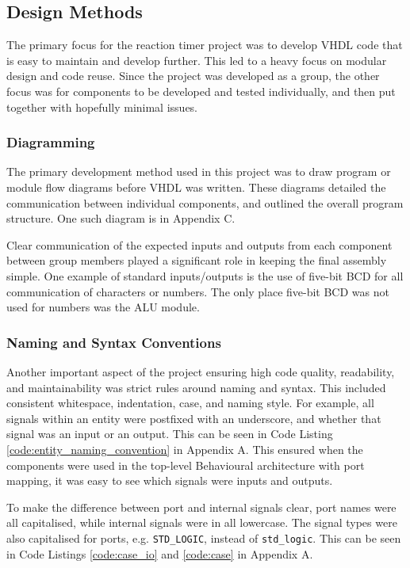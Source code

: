 \documentclass[11pt]{article}
\begin{document}
\subsection{Design Methods}

The primary focus for the reaction timer project was to develop VHDL code that is easy to maintain and develop further. This led to a heavy focus on modular design and code reuse. Since the project was developed as a group, the other focus was for components to be developed and tested individually, and then put together with hopefully minimal issues.

\subsubsection{Diagramming}

The primary development method used in this project was to draw program or module flow diagrams before VHDL was written. These diagrams detailed the communication between individual components, and outlined the overall program structure. One such diagram is in Appendix C.

Clear communication of the expected inputs and outputs from each component between group members played a significant role in keeping the final assembly simple. One example of standard inputs/outputs is the use of five-bit BCD for all communication of characters or numbers. The only place five-bit BCD was not used for numbers was the ALU module.

\subsubsection{Naming and Syntax Conventions}

Another important aspect of the project ensuring high code quality, readability, and maintainability was strict rules around naming and syntax. This included consistent whitespace, indentation, case, and naming style. For example, all signals within an entity were postfixed with an underscore, and whether that signal was an input or an output. This can be seen in Code Listing \ref{code:entity_naming_convention} in Appendix A. This ensured when the components were used in the top-level Behavioural architecture with port mapping, it was easy to see which signals were inputs and outputs.

To make the difference between port and internal signals clear, port names were all capitalised, while internal signals were in all lowercase. The signal types were also capitalised for ports, e.g. \texttt{STD\_LOGIC}, instead of \texttt{std\_logic}. This can be seen in Code Listings \ref{code:case_io} and \ref{code:case} in Appendix A.
\end{document}
